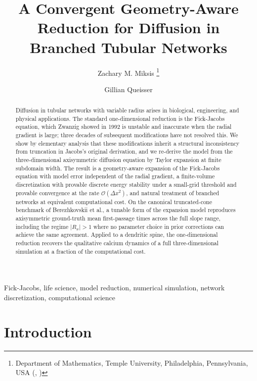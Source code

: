 \documentclass[11pt]{article}
\title{A Convergent Geometry-Aware Reduction for Diffusion in Branched Tubular Networks}
\author{Zachary M. Miksis  \thanks{Department of Mathematics, Temple University, Philadelphia, Pennsylvania, USA  (\email{miksis@temple.edu}, \email{queisser@temple.edu})} \and Gillian Queisser\footnotemark[1]}
\date{}
\begin{document}
\maketitle

\begin{abstract}
    Diffusion in tubular networks with variable radius arises in biological, engineering, and physical applications. The standard one-dimensional reduction is the Fick-Jacobs equation, which Zwanzig showed in 1992 is unstable and inaccurate when the radial gradient is large; three decades of subsequent modifications have not resolved this. We show by elementary analysis that these modifications inherit a structural inconsistency from truncation in Jacobs's original derivation, and we re-derive the model from the three-dimensional axisymmetric diffusion equation by Taylor expansion at finite subdomain width. The result is a geometry-aware expansion of the Fick-Jacobs equation with model error independent of the radial gradient, a finite-volume discretization with provable discrete energy stability under a small-grid threshold and provable convergence at the rate $\mathcal{O}(\Delta x^2)$, and natural treatment of branched networks at equivalent computational cost. On the canonical truncated-cone benchmark of Berezhkovskii et al., a tunable form of the expansion model reproduces axisymmetric ground-truth mean first-passage times across the full slope range, including the regime $|R_x| > 1$ where no parameter choice in prior corrections can achieve the same agreement. Applied to a dendritic spine, the one-dimensional reduction recovers the qualitative calcium dynamics of a full three-dimensional simulation at a fraction of the computational cost.
\end{abstract}

 Fick-Jacobs, life science, model reduction, numerical simulation, network discretization, computational science


\section{Introduction}
\end{document}
